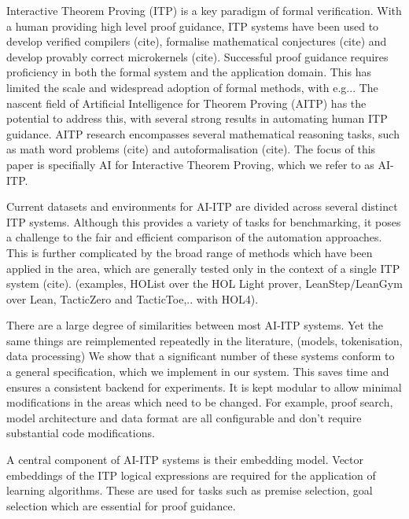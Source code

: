 \documentclass[letterpaper]{article} %
\begin{document}
    Interactive Theorem Proving (ITP) is a key paradigm of formal verification.
    With a human providing high level proof guidance, ITP systems have been used to develop verified compilers (cite), formalise mathematical conjectures (cite) and develop provably correct microkernels (cite).
    Successful proof guidance requires proficiency in both the formal system and the application domain.
    This has limited the scale and widespread adoption of formal methods, with e.g...
    The nascent field of Artificial Intelligence for Theorem Proving (AITP) has the potential to address this,
    with several strong results in automating human ITP guidance.
    AITP research encompasses several mathematical reasoning tasks, such as math word problems (cite) and autoformalisation (cite).
    The focus of this paper is specifially AI for Interactive Theorem Proving, which we refer to as AI-ITP.

    Current datasets and environments for AI-ITP are divided across several distinct ITP systems.
    Although this provides a variety of tasks for benchmarking,
    it poses a challenge to the fair and efficient comparison of the automation approaches.
    This is further complicated by the broad range of methods which have been applied in the area,
    which are generally tested only in the context of a single ITP system (cite).
    (examples, HOList over the HOL Light prover, LeanStep/LeanGym over Lean,
    TacticZero and TacticToe,.. with HOL4).

    There are a large degree of similarities between most AI-ITP systems.
    Yet the same things are reimplemented repeatedly in the literature, (models, tokenisation, data processing)
    We show that a significant number of these systems conform to a general specification,
    which we implement in our system. This saves time and ensures a consistent backend for experiments.
    It is kept modular to allow minimal modifications in the areas which need to be changed. For example, proof search,
    model architecture and data format are all configurable and don't require substantial code modifications.


    A central component of AI-ITP systems is their embedding model.
    Vector embeddings of the ITP logical expressions are required for the application of learning algorithms.
    These are used for tasks such as premise selection, goal selection which are essential for proof guidance.
\end{document}

